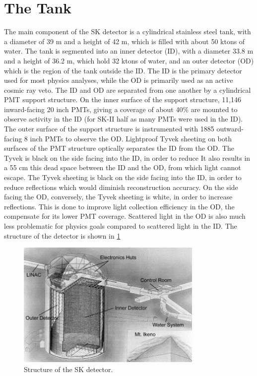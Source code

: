 \section{The Tank}
\label{sec:tank}
The main component of the SK detector is a cylindrical stainless steel tank, with a diameter of 39 m and a height of 42 m, which is filled with about 50 ktons of water.  The tank is segmented into an inner detector (ID), with a diameter 33.8 m and a height of 36.2 m, which hold 32 ktons of water, and an outer detector (OD) which is the region of the tank outside the ID.  The ID is the primary detector used for most physics analyses, while the OD is primarily used as an active cosmic ray veto.  The ID and OD are separated from one another by a cylindrical PMT support structure.  On the inner surface of the support structure, 11,146 inward-facing 20 inch PMTs, giving a coverage of about 40\% are mounted to observe activity in the ID (for SK-II half as many PMTs were used in the ID).  The outer surface of the support structure is instrumented with 1885 outward-facing 8 inch PMTs to observe the OD.  Lightproof Tyvek sheeting on both surfaces of the PMT structure optically separates the ID from the OD.  The Tyvek is black on the side facing into the ID, in order to reduce  It also results in a 55 cm this dead space between the ID and the OD, from which light cannot escape.  The Tyvek sheeting is black on the side facing into the ID, in order to reduce reflections which would diminish reconstruction accuracy.  On the side facing the OD, conversely, the Tyvek sheeting is white, in order to increase reflections.  This is done to improve light collection efficiency in the OD, the compensate for its lower PMT coverage.  Scattered light in the OD is also much less problematic for physics goals compared to scattered light in the ID.  The structure of the detector is shown in \cref{fig:sk_detector_diagrams}

\begin{figure}
\centering
\includegraphics[width=0.8\textwidth]{figures/sk_detector_under_mountain.jpg}
\caption{Structure of the SK detector. \cite{Fukuda:2002uc}}
\label{fig:sk_detector_diagrams} 
\end{figure}

